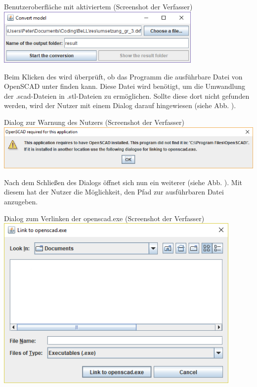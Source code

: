 \begin{Bild}{Benutzeroberfläche mit aktiviertem  (Screenshot der Verfasser)}
	\includegraphics[width = 100mm]{Bilder/GUI/GUI_Convert_Ready}
\end{Bild}

Beim Klicken des  wird überprüft, ob das Programm die ausführbare Datei von OpenSCAD unter  finden kann.
Diese Datei wird benötigt, um die Umwandlung der .scad-Dateien in .stl-Dateien zu ermöglichen.
Sollte diese dort nicht gefunden werden, wird der Nutzer mit einem Dialog darauf hingewiesen (siehe Abb. \thebildnrnext). \\

\begin{Bild}{Dialog zur Warnung des Nutzers (Screenshot der Verfasser)}
	\includegraphics[width = \textwidth]{Bilder/GUI/GUI_SCAD_Error}
\end{Bild}

Nach dem Schließen des Dialogs öffnet sich nun ein weiterer  (siehe Abb. \thebildnrnext).
Mit diesem hat der Nutzer die Möglichkeit, den Pfad zur ausführbaren Datei anzugeben. \\

\begin{Bild}{Dialog zum Verlinken der openscad.exe (Screenshot der Verfasser)}
	\includegraphics[width = 120mm]{Bilder/GUI/GUI_SCAD_Linking}
\end{Bild}

